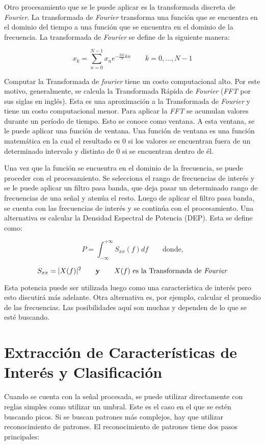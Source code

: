 Otro procesamiento que se le puede aplicar es la transformada discreta de \emph{Fourier}. La transformada de \emph{Fourier} transforma una función que se encuentra en el dominio del tiempo a una función que se encuentra en el dominio de la frecuencia. La transformada de \emph{Fourier} se define de la siguiente manera:

$$ x_{k} = \sum_{n=0}^{N-1} x_{n}e^{-\frac{2 \pi i}{N}kn} \qquad k = 0,\hdots, N - 1 $$

Computar la Transformada de \emph{fourier} tiene un costo computacional alto. Por este motivo, generalmente, se calcula la Transformada Rápida de \emph{Fourier} (\emph{FFT} por sus siglas en inglés). Esta es una aproximación a la Transformada de \emph{Fourier} y tiene un costo computacional menor. Para aplicar la \emph{FFT} se acumulan valores durante un período de tiempo. Esto se conoce como ventana. A esta ventana, se le puede aplicar una función de ventana. Una función de ventana es una función matemática en la cual el resultado es $0$ si los valores se encuentran fuera de un determinado intervalo y distinto de $0$ si se encuentran dentro de él. 

Una vez que la función se encuentra en el dominio de la frecuencia, se puede proceder con el procesamiento. Se selecciona el rango de frecuencias de interés y se le puede aplicar un filtro pasa banda, que deja pasar un determinado rango de frecuencias de una señal y atenúa el resto. Luego de aplicar el filtro pasa banda, se cuenta con las frecuencias de interés y se continúa con el procesamiento. Una alternativa es calcular la Densidad Espectral de Potencia (DEP). Esta se define como:

$$ P = \int_{-\infty}^{+\infty} S_{xx} (f) df \qquad  \textrm{donde,}$$

$$ S_{xx} = |X(f)|^{2} \qquad \textbf{y} \qquad X(f) \textrm{ es la Transformada de \emph{Fourier}} $$

Esta potencia puede ser utilizada luego como una característica de interés pero esto discutirá más adelante. Otra alternativa  es, por ejemplo, calcular el promedio de las frecuencias. Las posibilidades aquí son muchas y dependen de lo que se esté buscando.

\section{Extracción de Características de Interés y Clasificación}\label{sec:classification}

Cuando se cuenta con la señal procesada, se puede utilizar directamente con reglas simples como utilizar un umbral. Este es el caso en el que se estén buscando picos. Si se buscan patrones más complejos, hay que utilizar reconocimiento de patrones. El reconocimiento de patrones tiene dos pasos principales:

